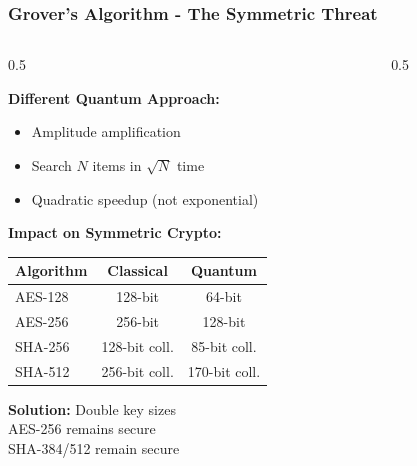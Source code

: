 \documentclass[aspectratio=169,10pt]{beamer}
\newcommand{\slideheader}[1]{\frametitle{#1}}
\theoremstyle{plain}
\begin{document}
\begin{frame}
  \slideheader{Grover's Algorithm - The Symmetric Threat}
  
  \begin{columns}[T]
    \begin{column}{0.5\textwidth}

    \textbf{Different Quantum Approach:}
    \begin{itemize}
      \item Amplitude amplification
      \item Search $N$ items in $\sqrt{N}$ time
      \item Quadratic speedup (not exponential)
    \end{itemize}
    
    \vspace{0.3cm}
    
    \textbf{Impact on Symmetric Crypto:}
    
    \begin{tabular}{|l|c|c|}
      \hline
      \textbf{Algorithm} & \textbf{Classical} & \textbf{Quantum} \\
      \hline
      AES-128 & 128-bit & 64-bit \\
      AES-256 & 256-bit & 128-bit \\
      SHA-256 & 128-bit coll. & 85-bit coll. \\
      SHA-512 & 256-bit coll. & 170-bit coll. \\
      \hline
    \end{tabular}
    
    \vspace{0.3cm}
    
    \begin{greenBox}
      \textbf{Solution:} Double key sizes\\
      AES-256 remains secure\\
      SHA-384/512 remain secure
    \end{greenBox}
  
    \end{column}
    \begin{column}{0.5\textwidth}

\end{column}
\end{columns}
\end{frame}
\end{document}
